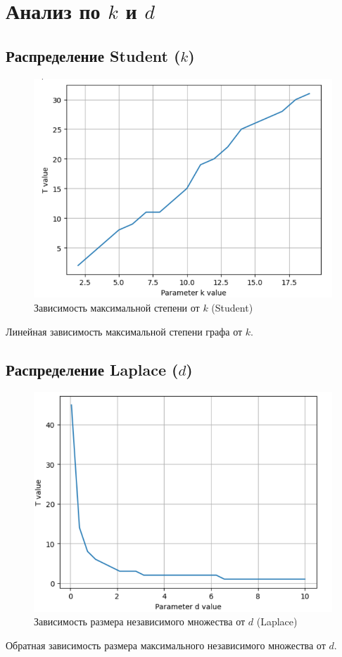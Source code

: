 \documentclass{HSEtitle}
\begin{document}
\section{Анализ по $k$ и $d$}

\subsection{Распределение Student ($k$)}
\begin{figure}[H]
    \centering
    \includegraphics[width=0.7\linewidth]{15.png}
    \caption{Зависимость максимальной степени от $k$ (Student)}
    \label{fig:student_k}
\end{figure}
Линейная зависимость максимальной степени графа от $k$.

\subsection{Распределение Laplace ($d$)}
\begin{figure}[H]
    \centering
    \includegraphics[width=0.7\linewidth]{17.png}
    \caption{Зависимость размера независимого множества от $d$ (Laplace)}
    \label{fig:laplace_d}
\end{figure}
Обратная зависимость размера максимального независимого множества от $d$.
\end{document}
